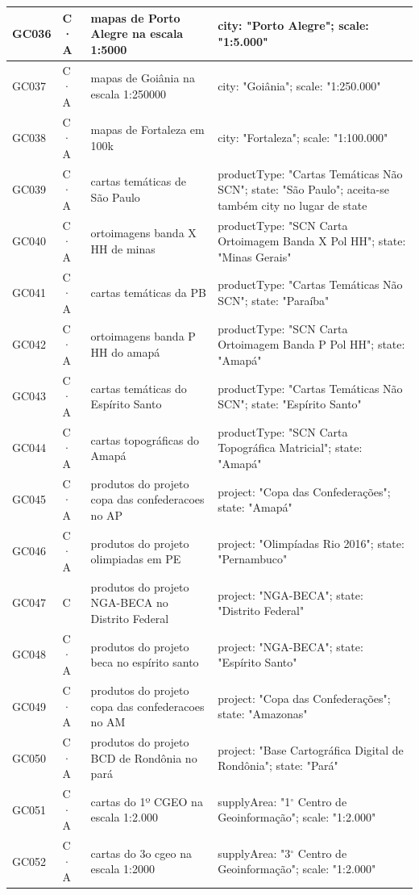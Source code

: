 {\begin{longtable}{|p{1.1cm}|p{1.3cm}|p{5.4cm}|p{6.3cm}|}
GC036 & C · A & mapas de Porto Alegre na escala 1:5000 & city: "Porto Alegre"; scale: "1:5.000" \\ \hline
GC037 & C · A & mapas de Goiânia na escala 1:250000 & city: "Goiânia"; scale: "1:250.000" \\ \hline
GC038 & C · A & mapas de Fortaleza em 100k & city: "Fortaleza"; scale: "1:100.000" \\ \hline
GC039 & C · A & cartas temáticas de São Paulo & productType: "Cartas Temáticas Não SCN"; state: "São Paulo"; aceita-se também city no lugar de state \\ \hline
GC040 & C · A & ortoimagens banda X HH de minas & productType: "SCN Carta Ortoimagem Banda X Pol HH"; state: "Minas Gerais" \\ \hline
GC041 & C · A & cartas temáticas da PB & productType: "Cartas Temáticas Não SCN"; state: "Paraíba" \\ \hline
GC042 & C · A & ortoimagens banda P HH do amapá & productType: "SCN Carta Ortoimagem Banda P Pol HH"; state: "Amapá" \\ \hline
GC043 & C · A & cartas temáticas do Espírito Santo & productType: "Cartas Temáticas Não SCN"; state: "Espírito Santo" \\ \hline
GC044 & C · A & cartas topográficas do Amapá & productType: "SCN Carta Topográfica Matricial"; state: "Amapá" \\ \hline
GC045 & C · A & produtos do projeto copa das confederacoes no AP & project: "Copa das Confederações"; state: "Amapá" \\ \hline
GC046 & C · A & produtos do projeto olimpiadas em PE & project: "Olimpíadas Rio 2016"; state: "Pernambuco" \\ \hline
GC047 & C & produtos do projeto NGA-BECA no Distrito Federal & project: "NGA-BECA"; state: "Distrito Federal" \\ \hline
GC048 & C · A & produtos do projeto beca no espírito santo & project: "NGA-BECA"; state: "Espírito Santo" \\ \hline
GC049 & C · A & produtos do projeto copa das confederacoes no AM & project: "Copa das Confederações"; state: "Amazonas" \\ \hline
GC050 & C · A & produtos do projeto BCD de Rondônia no pará & project: "Base Cartográfica Digital de Rondônia"; state: "Pará" \\ \hline
GC051 & C · A & cartas do 1º CGEO na escala 1:2.000 & supplyArea: "1$^\circ$ Centro de Geoinformação"; scale: "1:2.000" \\ \hline
GC052 & C · A & cartas do 3o cgeo na escala 1:2000 & supplyArea: "3$^\circ$ Centro de Geoinformação"; scale: "1:2.000" \\ \hline

\end{longtable}}
